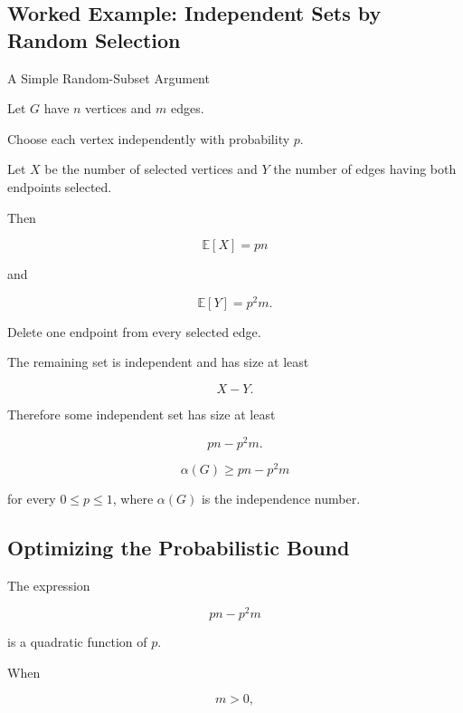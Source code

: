 \subsection{Worked Example: Independent Sets by Random Selection}
\label{subsec:worked-probabilistic-independent-set}

\begin{workedexamplebox}{A Simple Random-Subset Argument}

Let \(G\) have \(n\) vertices and \(m\) edges.

Choose each vertex independently with probability \(p\).

Let \(X\) be the number of selected vertices and \(Y\) the number of
edges having both endpoints selected.

Then

\[
\mathbb{E}[X]=pn
\]

and

\[
\mathbb{E}[Y]=p^2m.
\]

Delete one endpoint from every selected edge.

The remaining set is independent and has size at least

\[
X-Y.
\]

Therefore some independent set has size at least

\[
pn-p^2m.
\]

\begin{answerbox}
\[
\boxed{
\alpha(G)
\geq
pn-p^2m
}
\]

for every \(0\leq p\leq1\), where \(\alpha(G)\) is the independence
number.
\end{answerbox}

\end{workedexamplebox}

\subsection{Optimizing the Probabilistic Bound}
\label{subsec:optimizing-probabilistic-bound}

The expression

\[
pn-p^2m
\]

is a quadratic function of \(p\).

When

\[
m>0,
\]

